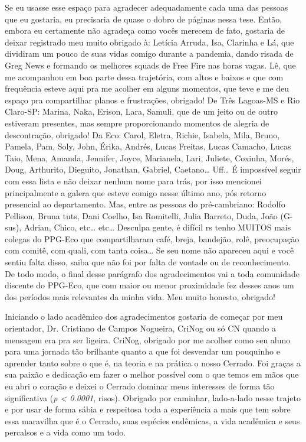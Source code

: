\documentclass[12pt,openright,oneside,a4paper,english]{abntex2}
\begin{document}
\begin{agradecimentos}[Agradecimentos]
Se eu usasse esse espaço para agradecer adequadamente cada uma das pessoas que eu gostaria, eu precisaria de quase o dobro de páginas nessa tese. Então, embora eu certamente não agradeça como vocês merecem de fato, gostaria de deixar registrado meu muito obrigado à: Letícia Arruda, Isa, Clarinha e Lá, que dividiram um pouco de suas vidas comigo durante a pandemia, dando risada de Greg News e formando os melhores squads de Free Fire nas horas vagas. Lê, que me acompanhou em boa parte dessa trajetória, com altos e baixos e que com frequência esteve aqui pra me acolher em alguns momentos, que teve e me deu espaço pra compartilhar planos e frustrações, obrigado! De Três Lagoas-MS e Rio Claro-SP: Marina, Naka, Erison, Lara, Samuli, que de um jeito ou de outro estiveram presentes, mas sempre proporcionando momentos de alegria de descontração, obrigado! Da Eco: Carol, Eletra, Richie, Isabela, Mila, Bruno, Pamela, Pam, Soly, John, Érika, Andrés, Lucas Freitas, Lucas Camacho, Lucas Taio, Mena, Amanda, Jennifer, Joyce, Marianela, Lari, Juliete, Coxinha, Morés, Doug, Arthurito, Dieguito, Jonathan, Gabriel, Caetano… Uff… É impossível seguir com essa lista e não deixar nenhum nome para trás, por isso mencionei principalmente a galera que esteve comigo nesse último ano, pós retorno presencial ao departamento. Mas, entre as pessoas do pré-cambriano: Rodolfo Pellison, Bruna tuts, Dani Coelho, Isa Romitelli, Julia Barreto, Duda, João (G-sus), Adrian, Chico, etc… etc… Desculpa gente, é difícil rs tenho MUITOS mais colegas do PPG-Eco que compartilharam café, breja, bandejão, rolê, preocupação com comitê, com quali, com tanta coisa… Se seu nome não apareceu aqui e você sentiu falta disso, saiba que não foi por falta de vontade ou de reconhecimento. De todo modo,  o final desse parágrafo dos agradecimentos vai a toda comunidade discente do PPG-Eco, que com maior ou menor proximidade fez desses anos um dos períodos mais relevantes da minha vida. Meu muito honesto, obrigado!

Iniciando o lado acadêmico dos agradecimentos gostaria de começar por meu orientador, Dr. Cristiano de Campos Nogueira, CriNog ou só CN quando a mensagem era pra ser ligeira. CriNog, obrigado por me acolher como seu aluno para uma jornada tão brilhante quanto a que foi desvendar um pouquinho e aprender tanto sobre o que é, na teoria e na prática o nosso Cerrado. Foi graças a sua paixão e dedicação em fazer o melhor possível com o que temos em mãos que eu abri o coração e deixei o Cerrado dominar meus interesses de forma tão significativa (\textit{p < 0.0001}, risos). Obrigado por caminhar, lado-a-lado nesse trajeto e por usar de forma sábia e respeitosa toda a experiência a mais que tem sobre essa maravilha que é o Cerrado, suas espécies endêmicas, a vida acadêmica e seus percalsos e a vida como um todo. 


\end{agradecimentos}
\end{document}
